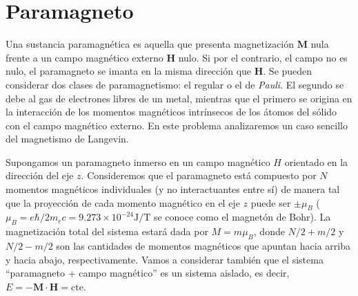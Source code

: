 \documentclass[a4paper,11pt]{article}
\begin{document}
\section{Paramagneto}

Una sustancia paramagnética es aquella que presenta magnetización
$\mathbf{M}$ nula frente a un campo magnético externo $\mathbf{H}$
nulo.
Si por el contrario, el campo no es nulo, el paramagneto se imanta en
la misma dirección que $\mathbf{H}$. Se pueden considerar dos clases de
paramagnetismo: el regular o el de \emph{Pauli}.
El segundo se debe al gas de electrones libres de un metal, mientras
que el primero se origina en la interacción de los momentos magnéticos
intrínsecos de los átomos del sólido con el campo magnético externo.
En este problema analizaremos un caso sencillo del magnetismo de
Langevin.

Supongamos un paramagneto inmerso en un campo magnético $H$
orientado en la dirección del eje $z$.
Consideremos que el paramagneto está compuesto por $N$ momentos
magnéticos individuales (y no interactuantes entre sí) de manera tal
que la proyección de cada momento magnético en el eje $z$
puede ser $\pm \mu_B$ ($\mu_B = e\hbar / 2m_e c = 9.273 \times
10^{-24} \text{J/T}$ se conoce como el magnetón de Bohr).
La magnetización total del sistema estará dada por $M = m \mu_B$, donde
$N/2 + m/2$ y $N/2 - m/2$ son las cantidades de momentos magnéticos que
apuntan hacia arriba y hacia abajo, respectivamente.
Vamos a considerar también que el sistema ``paramagneto + campo
magnético'' es un sistema aislado, es decir, $E = -
\mathbf{M}\cdot\mathbf{H} = \text{cte}$.
\end{document}
